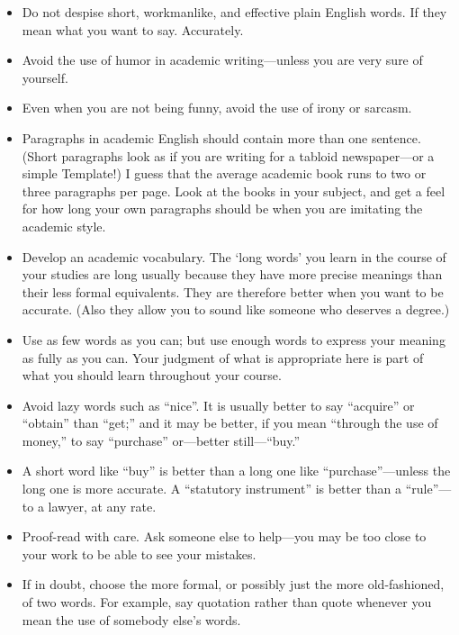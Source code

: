 \begin{itemize}
\item Do not despise short, workmanlike, and effective plain English words.
If they mean what you want to say. Accurately.
\item Avoid the use of humor in academic writing---unless you are very sure of yourself.
\item Even when you are not being funny, avoid the use of irony or sarcasm.
\item Paragraphs in academic English should contain more than one sentence.
(Short paragraphs look as if you are writing for a tabloid newspaper---or a simple Template!)
I guess that the average academic book runs to two or three paragraphs per page.
Look at the books in your subject, and get a feel for how long your own paragraphs should be when you are imitating the academic style.
\item Develop an academic vocabulary.
The `long words' you learn in the course of your studies are long usually because they have more precise meanings than their less formal equivalents.
They are therefore better when you want to be accurate.
(Also they allow you to sound like someone who deserves a degree.)
\end{itemize}



\begin{itemize}
\item  Use as few words as you can; but use enough words to express your meaning as fully as you can. Your judgment of what is appropriate here is part of what you should learn throughout your course.
\item  Avoid lazy words such as ``nice''.
It is usually better to say ``acquire'' or ``obtain'' than ``get;'' and it may be better, if you mean ``through the use of money,'' to say ``purchase'' or---better still---``buy.''
\item A short word like ``buy'' is better than a long one like ``purchase''---unless the long one is more accurate.
A ``statutory instrument'' is better than a ``rule''---to a lawyer, at any rate.
\item Proof-read with care.
Ask someone else to help---you may be too close to your work to be able to see your mistakes.
\item If in doubt, choose the more formal, or possibly just the more old-fashioned, of two words.
For example, say quotation rather than quote whenever you mean the use of somebody else's words.
\end{itemize}



